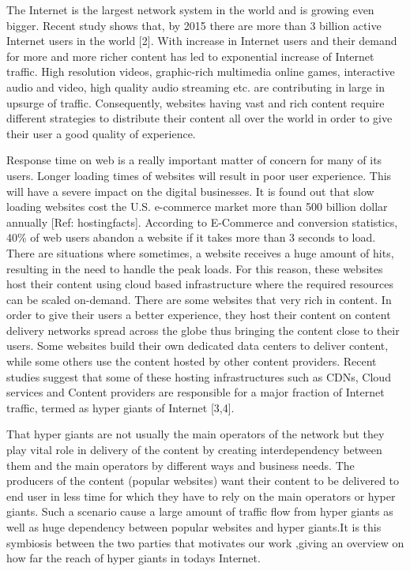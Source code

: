 The Internet is the largest network system in the world and is growing even bigger. Recent study shows that, by 2015 there are more than 3 billion active Internet users in the world [2]. With increase in Internet users and their demand for more and more richer content has led to exponential increase of Internet traffic. High resolution videos, graphic-rich multimedia online games, interactive audio and video, high quality audio streaming etc. are contributing in large in upsurge of traffic. Consequently, websites having vast and rich content require different strategies to distribute their content all over the world in order to give their user a good quality of experience.
  
Response time on web is a really important matter of concern for many of its users. Longer loading times of websites will result in poor user experience. This will have a severe impact on the digital businesses. It is found out that slow loading websites cost the U.S. e-commerce market more than 500 billion dollar annually [Ref: hostingfacts].  According to E-Commerce and conversion statistics, 40\% of web users abandon a website if it takes more than 3 seconds to load. There are situations where sometimes, a website receives a huge amount of hits, resulting in the need to handle the peak loads. For this reason, these websites host their content using cloud based infrastructure where the required resources can be scaled on-demand. There are some websites that very rich in content. In order to give their users a better experience, they host their content on content delivery networks spread across the globe thus bringing the content close to their users. Some websites build their own dedicated data centers to deliver content, while some others use the content hosted by other content providers. Recent studies suggest that some of these hosting infrastructures such as CDNs, Cloud services and Content providers are responsible for a major fraction of Internet traffic, termed as hyper giants of Internet [3,4].

That hyper giants are not usually the main operators of the network but they play vital role in delivery of the content by creating interdependency between them and the main operators by different ways and business needs. The producers of the content (popular websites) want their content to be delivered to end user in less time for which they have to rely on the main operators or hyper giants. Such a scenario cause a large amount of traffic flow from hyper giants as well as huge dependency between popular websites and hyper giants.It is this symbiosis between the
two parties that motivates our work ,giving an overview on how far the reach of hyper
giants in todays Internet.

